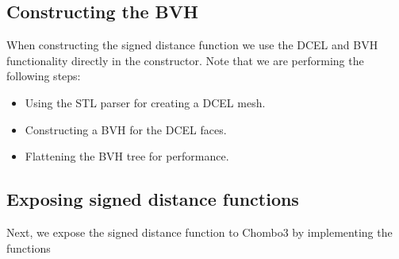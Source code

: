 \documentclass[letterpaper,10pt,english]{sphinxmanual}
\begin{document}
\begin{sphinxVerbatim}[commandchars=\\\{\}]

\end{sphinxVerbatim}


\subsection{Constructing the BVH}
\label{\detokenize{Example_Chombo3:constructing-the-bvh}}
\sphinxAtStartPar
When constructing the signed distance function we use the DCEL and BVH functionality directly in the constructor.
Note that we are performing the following steps:
\begin{itemize}
\item {} 
\sphinxAtStartPar
Using the STL parser for creating a DCEL mesh.

\item {} 
\sphinxAtStartPar
Constructing a BVH for the DCEL faces.

\item {} 
\sphinxAtStartPar
Flattening the BVH tree for performance.

\end{itemize}


\subsection{Exposing signed distance functions}
\label{\detokenize{Example_Chombo3:exposing-signed-distance-functions}}
\sphinxAtStartPar
Next, we expose the signed distance function to Chombo3 by implementing the functions
\end{document}
